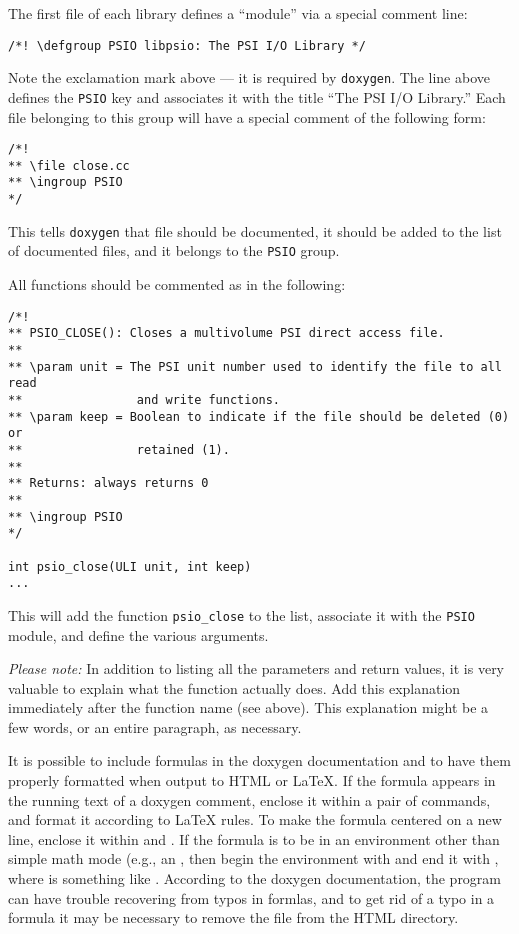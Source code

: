 The first file of each library defines a ``module'' via a special
comment line:
\begin{verbatim}
/*! \defgroup PSIO libpsio: The PSI I/O Library */
\end{verbatim}
Note the exclamation mark above --- it is required by {\tt doxygen}.
The line above defines the {\tt PSIO} key and associates it with the
title ``The PSI I/O Library.'' Each file belonging to this group will
have a special comment of the following form:
\begin{verbatim}
/*!
** \file close.cc
** \ingroup PSIO
*/
\end{verbatim}
This tells {\tt doxygen} that file  should be
documented, it should be added to the list of documented files, and it
belongs to the {\tt PSIO} group.

All functions should be commented as in the following:
\begin{verbatim}
/*!
** PSIO_CLOSE(): Closes a multivolume PSI direct access file.
**
** \param unit = The PSI unit number used to identify the file to all read
**                and write functions.
** \param keep = Boolean to indicate if the file should be deleted (0) or
**                retained (1).
**
** Returns: always returns 0
**
** \ingroup PSIO
*/

int psio_close(ULI unit, int keep)
...
\end{verbatim}
This will add the function {\tt psio\_close} to the list, associate it with
the {\tt PSIO} module, and define the various arguments.

{\em Please note:} In addition to listing all the parameters and return
values, it is very valuable to explain what the function actually does.
Add this explanation immediately after the function name (see above).  This
explanation might be a few words, or an entire paragraph, as necessary.

It is possible to include formulas in the doxygen documentation
and to have them properly formatted when output to HTML or LaTeX.
If the formula appears in the running text of a doxygen comment,
enclose it within a pair of  commands,
and format it according to LaTeX rules.  To make the formula
centered on a new line, enclose it within \celem{$\backslash$f[} and
\celem{$\backslash$f]}.  If the formula is to be in an environment
other than simple math mode (e.g., an , then begin
the environment with  and end it
with , where  is something
like .  According to the doxygen documentation,
the program can have trouble recovering from typos in formlas, and to
get rid of a typo in a formula it may be necessary to remove the file
 from the HTML directory.


